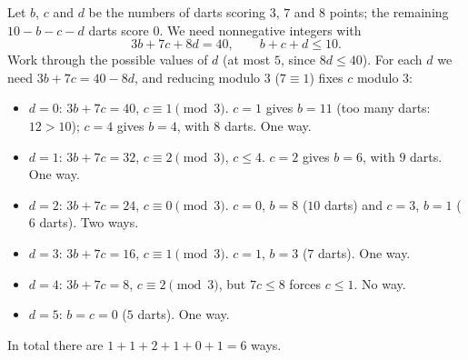 Let $b$, $c$ and $d$ be the numbers of darts scoring $3$, $7$ and $8$ points; the remaining $10-b-c-d$ darts score $0$. We need nonnegative integers with
\[3b+7c+8d=40,\qquad b+c+d\le10 .\]
Work through the possible values of $d$ (at most $5$, since $8d\le40$). For each $d$ we need $3b+7c=40-8d$, and reducing modulo $3$ ($7\equiv1$) fixes $c$ modulo $3$:
\begin{itemize}
\item $d=0$: $3b+7c=40$, $c\equiv1\pmod3$. $c=1$ gives $b=11$ (too many darts: $12>10$); $c=4$ gives $b=4$, with $8$ darts. One way.
\item $d=1$: $3b+7c=32$, $c\equiv2\pmod3$, $c\le4$. $c=2$ gives $b=6$, with $9$ darts. One way.
\item $d=2$: $3b+7c=24$, $c\equiv0\pmod3$. $c=0$, $b=8$ ($10$ darts) and $c=3$, $b=1$ ($6$ darts). Two ways.
\item $d=3$: $3b+7c=16$, $c\equiv1\pmod3$. $c=1$, $b=3$ ($7$ darts). One way.
\item $d=4$: $3b+7c=8$, $c\equiv2\pmod3$, but $7c\le8$ forces $c\le1$. No way.
\item $d=5$: $b=c=0$ ($5$ darts). One way.
\end{itemize}
In total there are $1+1+2+1+0+1=\boxed{6}$ ways.
